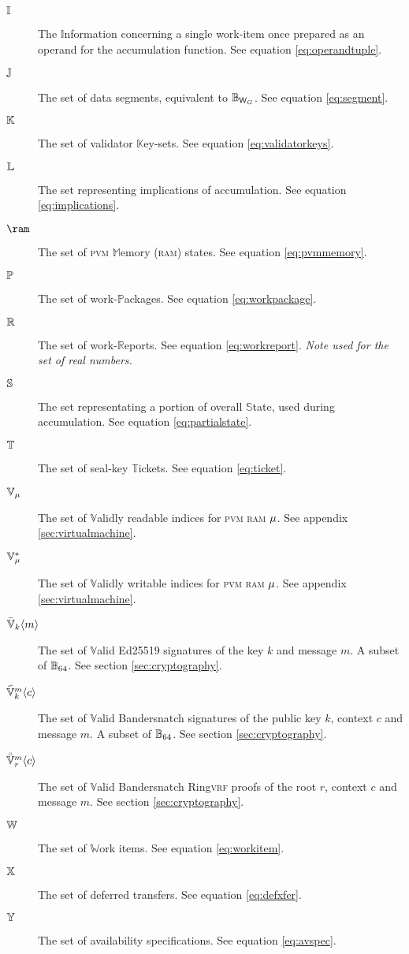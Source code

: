 \begin{description}
\begin{description}
  \end{description}
  \item[$\operandtuple$] The $\mathbb{I}$nformation concerning a single work-item once prepared as an operand for the accumulation function. See equation \ref{eq:operandtuple}.
  \item[$\segment$] The set of data segments, equivalent to $\blob[\Csegmentsize]$. See equation \ref{eq:segment}.
  \item[$\valkey$] The set of validator $\mathbb{K}$ey-sets. See equation \ref{eq:validatorkeys}.
  \item[$\implications$] The set representing implications of accumulation. See equation \ref{eq:implications}.
  \item[$\ram$] The set of \textsc{pvm} $\mathbb{M}$emory (\textsc{ram}) states. See equation \ref{eq:pvmmemory}.
  \item[$\workpackage$] The set of work-$\mathbb{P}$ackages. See equation \ref{eq:workpackage}.
  \item[$\workreport$] The set of work-$\mathbb{R}$eports. See equation \ref{eq:workreport}. \emph{Note used for the set of real numbers.}
  \item[$\partialstate$] The set representating a portion of overall $\mathbb{S}$tate, used during accumulation. See equation \ref{eq:partialstate}.
  \item[$\safroleticket$] The set of seal-key $\mathbb{T}$ickets. See equation \ref{eq:ticket}.
  \item[$\readable{\memory}$] The set of $\mathbb{V}$alidly readable indices for \textsc{pvm} \textsc{ram} $\memory$. See appendix \ref{sec:virtualmachine}.
  \item[$\writable{\memory}$] The set of $\mathbb{V}$alidly writable indices for \textsc{pvm} \textsc{ram} $\memory$. See appendix \ref{sec:virtualmachine}.
  \item[$\edsignature{k}{m}$] The set of $\mathbb{V}$alid Ed25519 signatures of the key $k$ and message $m$. A subset of $\blob[64]$. See section \ref{sec:cryptography}.
  \item[$\bssignature{k}{c}{m}$] The set of $\mathbb{V}$alid Bandersnatch signatures of the public key $k$, context $c$ and message $m$. A subset of $\blob[64]$. See section \ref{sec:cryptography}.
  \item[$\bsringproof{r}{c}{m}$] The set of $\mathbb{V}$alid Bandersnatch Ring\textsc{vrf} proofs of the root $r$, context $c$ and message $m$. See section \ref{sec:cryptography}.
  \item[$\workitem$] The set of $\mathbb{W}$ork items. See equation \ref{eq:workitem}.
  \item[$\defxfer$] The set of deferred transfers. See equation \ref{eq:defxfer}.
  \item[$\avspec$] The set of availability specifications. See equation \ref{eq:avspec}.
\end{description}

